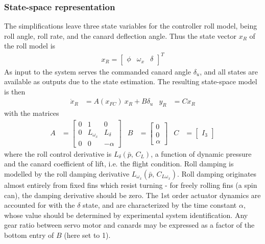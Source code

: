 \subsubsection{State-space representation}
The simplifications leave three state variables for the controller roll model, being roll angle, roll rate, and the canard deflection angle.
Thus the state vector $x_R$ of the roll model is 
\begin{align}
    x_R = \begin{bmatrix} \phi & \omega_x & \delta \end{bmatrix}^T
    \label{eq:controller-model-state}
\end{align}
As input to the system serves the commanded canard angle $\delta_u$, and all states are available as outputs due to the state estimation.
The resulting state-space model is then 
\begin{align}
    \dot x_R &= A(x_{FC}) \: x_R + B \delta_u 
    &
    y_R &= C x_R
    \label{eq:controller-model-ss}
\end{align}
with the matrices
\begin{align}    
    A &= \begin{bmatrix}
        0 & 1 & 0 \\
        0 & L_{\omega_x} & L_\delta \\
        0 & 0 & -\alpha
    \end{bmatrix}
    &
    B &= \begin{bmatrix}
        0 \\ 0 \\ \alpha
    \end{bmatrix}
    &
    C &= \begin{bmatrix} I_3 \end{bmatrix}
    \label{eq:controller-model-matrices}
\end{align}
where the roll control derivative is $L_\delta (\bar p,  \,  C_L)$, a function of dynamic pressure and the canard coefficient of lift, i.e. the flight condition.
Roll damping is modelled by the roll damping derivative $L_{\omega_x} (\bar p, \, C_{L \omega_x})$.
Roll damping originates almost entirely from fixed fins which resist turning - for freely rolling fins (a spin can), the damping derivative should be zero.
The 1st order actuator dynamics are accounted for with the $\delta$ state, and are characterized by the time constant $\alpha$, whose value should be determined by experimental system identification.
Any gear ratio between servo motor and canards may be expressed as a factor of the bottom entry of $B$ (here set to 1).